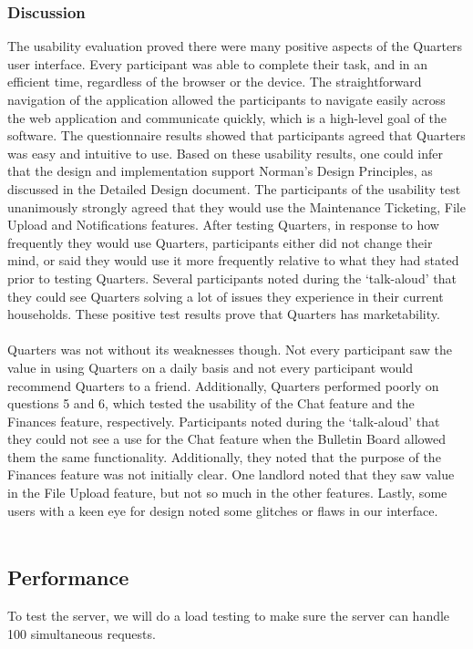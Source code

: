 \documentclass[12pt]{article}
\begin{document}
\subsubsection{Discussion}
The usability evaluation proved there were many positive aspects of the Quarters user interface. Every participant was able to complete their task, and in an efficient time, regardless of the browser or the device. The straightforward navigation of the application allowed the participants to navigate easily across the web application and communicate quickly, which is a high-level goal of the software. The questionnaire results showed that participants agreed that Quarters was easy and intuitive to use. Based on these usability results, one could infer that the design and implementation support Norman’s Design Principles, as discussed in the Detailed Design document. The participants of the usability test unanimously strongly agreed that they would use the Maintenance Ticketing, File Upload and Notifications features. After testing Quarters, in response to how frequently they would use Quarters, participants either did not change their mind, or said they would use it more frequently relative to what they had stated prior to testing Quarters. Several participants noted during the ‘talk-aloud’ that they could see Quarters solving a lot of issues they experience in their current households. These positive test results prove that Quarters has marketability. \\ \\
Quarters was not without its weaknesses though. Not every participant saw the value in using Quarters on a daily basis and not every participant would recommend Quarters to a friend. Additionally, Quarters performed poorly on questions 5 and 6, which tested the usability of the Chat feature and the Finances feature, respectively. Participants noted during the ‘talk-aloud’ that they could not see a use for the Chat feature when the Bulletin Board allowed them the same functionality. Additionally, they noted that the purpose of the Finances feature was not initially clear. One landlord noted that they saw value in the File Upload feature, but not so much in the other features. Lastly, some users with a keen eye for design noted some glitches or flaws in our interface. \\ \\
 



\subsection{Performance}
To test the server, we will do a load testing to make sure the server can handle 100 simultaneous requests.
\end{document}
